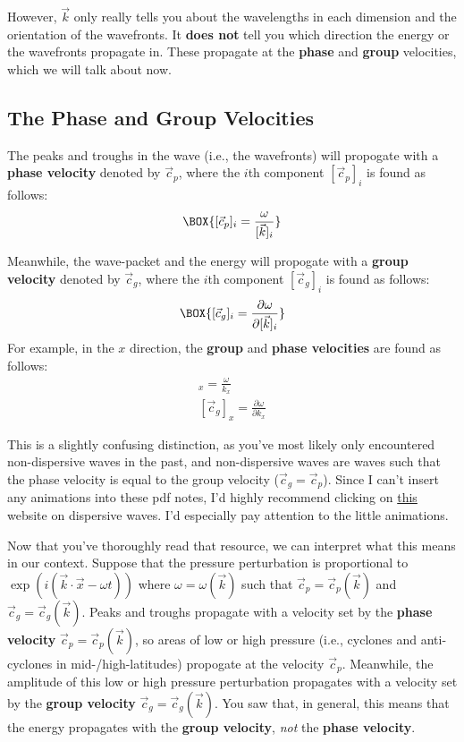 However, $\vec{k}$ only really tells you about the wavelengths in each dimension and the orientation of the wavefronts. It \textbf{does not} tell you which direction the energy or the wavefronts propagate in. These propagate at the \textbf{phase} and \textbf{group} velocities, which we will talk about now.

\subsection{The Phase and Group Velocities}

The peaks and troughs in the wave (i.e., the wavefronts) will propogate with a \textbf{phase velocity} denoted by $\vec{c}_p$, where the $i$th component $[\vec{c}_p]_i$ is found as follows:
\begin{align}
    \label{Phase Velocity}
    \BOX{[\vec{c}_p]_i=\frac{\omega}{[\vec{k}]_i}}
\end{align}

Meanwhile, the wave-packet and the energy will propogate with a \textbf{group velocity} denoted by $\vec{c}_g$, where the $i$th component $[\vec{c}_g]_i$ is found as follows:
\begin{align}
    \label{Group Velocity}
    \BOX{[\vec{c}_g]_i=\frac{\partial\omega}{\partial [\vec{k}]_i}}
\end{align}
For example, in the $x$ direction, the \textbf{group} and \textbf{phase velocities} are found as follows:
\begin{align*}
    [\vec{c}_p]_x=\frac{\omega}{k_x}\\
    [\vec{c}_g]_x=\frac{\partial\omega}{\partial k_x}
\end{align*}

This is a slightly confusing distinction, as you've most likely only encountered non-dispersive waves in the past, and non-dispersive waves are waves such that the phase velocity is equal to the group velocity ($\vec{c}_g=\vec{c}_p$). Since I can't insert any animations into these pdf notes, I'd highly recommend clicking on \href{https://resource.isvr.soton.ac.uk/spcg/tutorial/tutorial/Tutorial_files/Web-further-dispersive.htm}{this} website on dispersive waves. I'd especially pay attention to the little animations.

Now that you've thoroughly read that resource, we can interpret what this means in our context. Suppose that the pressure perturbation is proportional to $\exp(i(\vec{k}\cdot\vec{x}-\omega t))$ where $\omega=\omega(\vec{k})$ such that $\vec{c}_p=\vec{c}_p(\vec{k})$ and $\vec{c}_g=\vec{c}_g(\vec{k})$. Peaks and troughs propagate with a velocity set by the \textbf{phase velocity} $\vec{c}_p=\vec{c}_p(\vec{k})$, so areas of low or high pressure (i.e., cyclones and anti-cyclones in mid-/high-latitudes) propogate at the velocity $\vec{c}_p$. Meanwhile, the amplitude of this low or high pressure perturbation propagates with a velocity set by the \textbf{group velocity} $\vec{c}_g=\vec{c}_g(\vec{k})$. You saw that, in general, this means that the energy propagates with the \textbf{group velocity}, \textit{not} the \textbf{phase velocity}.

